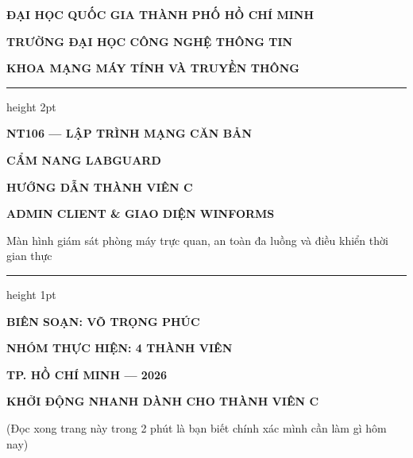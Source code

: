 \documentclass[12pt,a4paper]{article}
\begin{document}
\begin{titlepage}
  \centering
  \vspace*{-10mm}
  {\bfseries\large ĐẠI HỌC QUỐC GIA THÀNH PHỐ HỒ CHÍ MINH\par}
  {\bfseries\large TRƯỜNG ĐẠI HỌC CÔNG NGHỆ THÔNG TIN\par}
  {\bfseries\large KHOA MẠNG MÁY TÍNH VÀ TRUYỀN THÔNG\par}
  \vspace{15mm}
  {\color{lgDeepBlue}\hrule height 2pt}
  \vspace{12mm}
  {\bfseries\large NT106 — LẬP TRÌNH MẠNG CĂN BẢN\par}
  \vspace{12mm}
  {\bfseries\huge\color{lgDeepBlue} CẨM NANG LABGUARD\par}
  \vspace{5mm}
  {\bfseries\Huge\color{lgDeepBlue} HƯỚNG DẪN THÀNH VIÊN C\par}
  \vspace{8mm}
  {\bfseries\Large ADMIN CLIENT \& GIAO DIỆN WINFORMS\par}
  \vspace{4mm}
  {\large Màn hình giám sát phòng máy trực quan, an toàn đa luồng và điều khiển thời gian thực\par}
  \vspace{12mm}
  {\color{lgTeal}\hrule height 1pt}
  \vspace{25mm}
  {\large\textbf{BIÊN SOẠN: VÕ TRỌNG PHÚC}\par}
  \vspace{6mm}
  {\large\textbf{NHÓM THỰC HIỆN: 4 THÀNH VIÊN}\par}
  \vfill
  {\bfseries\color{lgSlate} TP. HỒ CHÍ MINH — 2026\par}
\end{titlepage}

\thispagestyle{empty}
\vspace*{-8mm}
{\centering\Large\bfseries\color{lgDeepBlue} KHỞI ĐỘNG NHANH DÀNH CHO THÀNH VIÊN C\par}
\vspace{1mm}
{\centering\footnotesize\color{lgGray} (Đọc xong trang này trong 2 phút là bạn biết chính xác mình cần làm gì hôm nay)\par}
\vspace{4mm}
\end{document}
